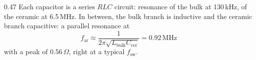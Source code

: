 \begin{frame}
\begin{columns}[T]
\begin{column}{0.47\textwidth}
			Each capacitor is a series $RLC$ circuit: resonance of the bulk at 130\,kHz, of the ceramic at 6.5\,MHz. In between, the bulk branch is inductive and the ceramic branch capacitive: a parallel resonance at
			\begin{equation*}
				f_\mathrm{ar}\approx\frac{1}{2\pi\sqrt{L_\mathrm{bulk}C_\mathrm{cer}}}=0.92\,\mathrm{MHz}
			\end{equation*}
			with a peak of 0.56\,$\Omega$, right at a typical $f_\mathrm{sw}$.
		\end{column}
	\end{columns}
\end{frame}

